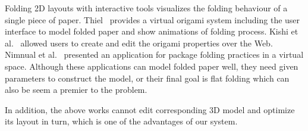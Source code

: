 Folding 2D layouts with interactive tools visualizes the folding behaviour of a single piece of paper. Thiel~\cite{Thiel1998} provides a virtual origami system including the user interface to model folded paper and show animations of folding process. Kishi et al.~\cite{Kishi:1998:OFP:786112.786279} allowed users to create and edit the origami properties over the Web. Nimnual et al.~\cite{Nimnual2007Virtual} presented an application for package folding practices in a virtual space. Although these applications can model folded paper well, they need given parameters to construct the model, or their final goal is flat folding which can also be seem a premier to the problem.

In addition, the above works cannot edit corresponding 3D model and optimize its layout in turn, which is one of the advantages of our system.

